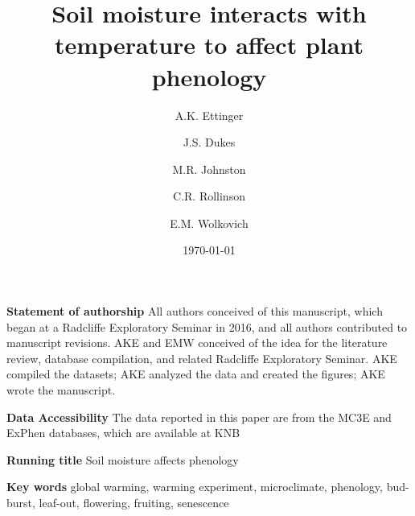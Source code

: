 \documentclass{article}
\begin{document}


\title{Soil moisture interacts with temperature to affect plant phenology}
\begin{singlespace}

\author[1,2,a]{A.K. Ettinger}
\author[3,b]{J.S. Dukes}
\author[4,c]{M.R. Johnston}
\author[5,d]{C.R. Rollinson}
\author[1,4,6,e]{E.M. Wolkovich}













\date{\today}
\maketitle %

\textbf{Statement of authorship} 
All authors conceived of this manuscript, which began at a Radcliffe Exploratory Seminar in 2016, and all authors contributed to manuscript revisions. AKE and EMW conceived of the idea for the literature review, database compilation, and related Radcliffe Exploratory Seminar. AKE compiled the datasets; AKE analyzed the data and created the figures; AKE wrote the manuscript.

\textbf{Data Accessibility} %
The data reported in this paper are from the MC3E and ExPhen databases, which are available at KNB \citep{ettinger2018,ettinger2019}

\textbf{Running title} Soil moisture affects phenology


\textbf{Key words} global warming, warming experiment, microclimate, phenology, bud-burst, leaf-out, flowering, fruiting, senescence 
\end{singlespace}
\end{document}
